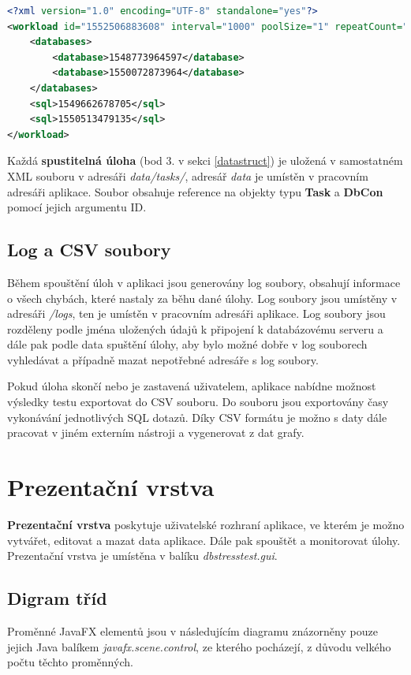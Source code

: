 \documentclass[czech,bachelor,public,dept460,male,cpdeclaration,twoside]{diploma}
\begin{document}
\begin{minipage}{\linewidth}
\begin{lstlisting}[caption=Spustitelná úloha ve formátu XML\label{lst:task},language=XML] 
<?xml version="1.0" encoding="UTF-8" standalone="yes"?>
<workload id="1552506883608" interval="1000" poolSize="1" repeatCount="-1" taskName="SuperTest">
    <databases>
        <database>1548773964597</database>
        <database>1550072873964</database>
    </databases>
    <sql>1549662678705</sql>
    <sql>1550513479135</sql>
</workload>
\end{lstlisting}
Každá \textbf{spustitelná úloha} (bod 3. v sekci \ref{datastruct}) je uložená v samostatném XML souboru v adresáři \textit{data/tasks/}, adresář \textit{data} je umístěn v pracovním adresáři aplikace. Soubor obsahuje reference na objekty typu \textbf{Task} a \textbf{DbCon} pomocí jejich argumentu ID.
\end{minipage}

\subsection{Log a CSV soubory} \label{logs}
Během spouštění úloh v aplikaci jsou generovány log soubory, obsahují informace o všech chybách, které nastaly za běhu dané úlohy. Log soubory jsou umístěny v adresáři \textit{/logs}, ten je umístěn v pracovním adresáři aplikace. Log soubory jsou rozděleny podle jména uložených údajů k připojení k databázovému serveru a dále pak podle data spuštění úlohy, aby bylo možné dobře v log souborech vyhledávat a případně mazat nepotřebné adresáře s log soubory.

Pokud úloha skončí nebo je zastavená uživatelem, aplikace nabídne možnost výsledky testu exportovat do CSV souboru. Do souboru jsou exportovány časy vykonávání jednotlivých SQL dotazů. Díky CSV formátu je možno s daty dále pracovat v jiném externím nástroji a vygenerovat z dat grafy.

\section{Prezentační vrstva} \label{presentlayer}
\textbf{Prezentační vrstva} poskytuje uživatelské rozhraní aplikace, ve kterém je možno vytvářet, editovat a mazat data aplikace. Dále pak spouštět a monitorovat úlohy. Prezentační vrstva je umístěna v balíku \textit{dbstresstest.gui}.
\subsection{Digram tříd} \label{prezent}
Proměnné JavaFX elementů jsou v následujícím diagramu znázorněny pouze jejich Java balíkem \textit{javafx.scene.control}, ze kterého pocházejí, z důvodu velkého počtu těchto proměnných.
\end{document}
